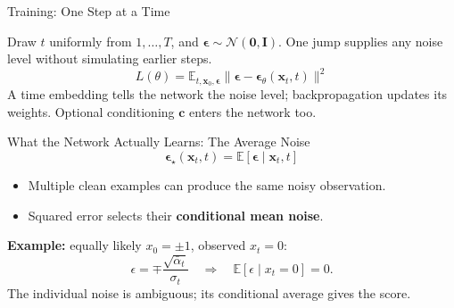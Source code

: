 \documentclass{ntuabeamer}
\begin{document}
\begin{frame}{Training: One Step at a Time}
  \small
  \begin{center}
  \end{center}
  Draw \(t\) uniformly from \(1,\ldots,T\), and \(\boldsymbol\epsilon\sim\mathcal N(\mathbf0,\mathbf I)\). One jump supplies any noise level without simulating earlier steps.
  \[\boxed{L(\theta)=\mathbb E_{t,\mathbf x_0,\boldsymbol\epsilon}\|\boldsymbol\epsilon-\boldsymbol\epsilon_\theta(\mathbf x_t,t)\|^2}\]
  A time embedding tells the network the noise level; backpropagation updates its weights. Optional conditioning \(\mathbf c\) enters the network too.
\end{frame}

\begin{frame}{What the Network Actually Learns: The Average Noise}
  \[\boxed{\boldsymbol\epsilon_\star(\mathbf x_t,t)
    =\mathbb E[\boldsymbol\epsilon\mid\mathbf x_t,t]}\]
  \begin{itemize}
    \item Multiple clean examples can produce the same noisy observation.
    \item Squared error selects their \textbf{conditional mean noise}.
  \end{itemize}
  \textbf{Example:} equally likely \(x_0=\pm1\), observed \(x_t=0\):
  \[\epsilon=\mp\frac{\sqrt{\bar\alpha_t}}{\sigma_t}
    \quad\Longrightarrow\quad \mathbb E[\epsilon\mid x_t=0]=0.\]
  The individual noise is ambiguous; its conditional average gives the score.
\end{frame}
\end{document}

